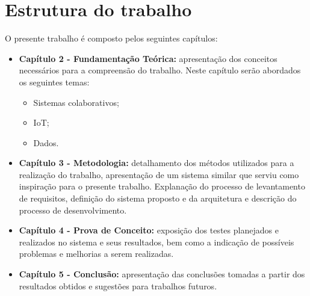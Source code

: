 \section{Estrutura do trabalho}
O presente trabalho é composto pelos seguintes capítulos:
\begin{itemize}
  \item \textbf{Capítulo 2 - Fundamentação Teórica:} apresentação dos conceitos necessários para a compreensão do
  trabalho. Neste capítulo serão abordados os seguintes temas:
  \begin{itemize}
    \item Sistemas colaborativos;
    \item \acrlong{IoT};
    \item Dados.
  \end{itemize}
  \item \textbf{Capítulo 3 - Metodologia:} detalhamento dos métodos utilizados para a realização do trabalho,
  apresentação de um sistema similar que serviu como inspiração para o presente trabalho.
  Explanação do processo de levantamento de requisitos, definição do sistema proposto e da arquitetura
  e descrição do processo de desenvolvimento.
  \item \textbf{Capítulo 4 - Prova de Conceito:} exposição dos testes planejados e realizados no sistema e seus resultados, bem como a indicação de possíveis problemas e melhorias a serem realizadas.
  \item \textbf{Capítulo 5 - Conclusão:} apresentação das conclusões tomadas a partir dos resultados obtidos e
  sugestões para trabalhos futuros.
\end{itemize}

